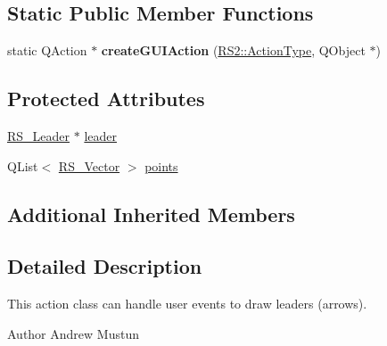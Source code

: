 \subsection*{Static Public Member Functions}
\begin{DoxyCompactItemize}
\item 
\hypertarget{classRS__ActionDimLeader_a7d1e5a7561189e66b6c0d3c5706ed561}{static Q\-Action $\ast$ {\bfseries create\-G\-U\-I\-Action} (\hyperlink{classRS2_afe3523e0bc41fd637b892321cfc4b9d7}{R\-S2\-::\-Action\-Type}, Q\-Object $\ast$)}\label{classRS__ActionDimLeader_a7d1e5a7561189e66b6c0d3c5706ed561}

\end{DoxyCompactItemize}
\subsection*{Protected Attributes}
\begin{DoxyCompactItemize}
\item 
\hyperlink{classRS__Leader}{R\-S\-\_\-\-Leader} $\ast$ \hyperlink{classRS__ActionDimLeader_aa6d5975fd2e44dc02148d68f13c5feb3}{leader}
\item 
Q\-List$<$ \hyperlink{classRS__Vector}{R\-S\-\_\-\-Vector} $>$ \hyperlink{classRS__ActionDimLeader_a11d1b9926c1a86a1f3939a60fccc66b7}{points}
\end{DoxyCompactItemize}
\subsection*{Additional Inherited Members}


\subsection{Detailed Description}
This action class can handle user events to draw leaders (arrows).

\begin{DoxyAuthor}{Author}
Andrew Mustun 
\end{DoxyAuthor}



